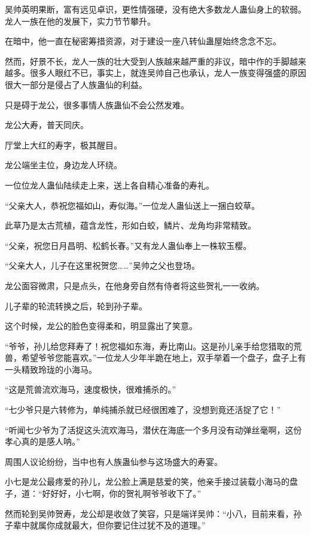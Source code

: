 
\begin{this_body}

吴帅英明果断，富有远见卓识，更性情强硬，没有绝大多数龙人蛊仙身上的软弱。龙人一族在他的发展下，实力节节攀升。

在暗中，他一直在秘密筹措资源，对于建设一座八转仙蛊屋始终念念不忘。

然而，好景不长，龙人一族的壮大受到人族越来越严重的非议，暗中作的手脚越来越多。很多人眼红不已，事实上，就连吴帅自己也承认，龙人一族变得强盛的原因很大一部分是侵占了人族蛊仙的利益。

只是碍于龙公，很多事情人族蛊仙不会公然发难。

龙公大寿，普天同庆。

厅堂上大红的寿字，极其醒目。

龙公端坐主位，身边龙人环绕。

一位位龙人蛊仙陆续走上来，送上各自精心准备的寿礼。

“父亲大人，恭祝您福如山，寿似海。”一位龙人蛊仙送上一捆白蛟草。

此草乃是太古荒植，蕴含龙性，形如白蛟，鳞片、龙角均非常精致。

“父亲，祝您日月昌明、松鹤长春。”又有龙人蛊仙奉上一株软玉樱。

“父亲大人，儿子在这里祝贺您……”吴帅之父也登场。

龙公面容微肃，只是点头，在他身旁自然有侍者将这些贺礼一一收纳。

儿子辈的轮流转换之后，轮到孙子辈。

这个时候，龙公的脸色变得柔和，明显露出了笑意。

“爷爷，孙儿给您拜寿了！祝您福如东海，寿比南山。这是孙儿亲手给您猎取的荒兽，希望爷爷您能喜欢。”一位龙人少年半跪在地上，双手举着一个盘子，盘子上有一头精致玲珑的小海马。

“这是荒兽流欢海马，速度极快，很难捕杀的。”

“七少爷只是六转修为，单纯捕杀就已经很困难了，没想到竟还活捉了它！”

“听闻七少爷为了活捉这头流欢海马，潜伏在海底一个多月没有动弹丝毫啊，这份孝心真的是感人呐。”

周围人议论纷纷，当中也有人族蛊仙参与这场盛大的寿宴。

小七是龙公最疼爱的孙儿，龙公脸上满是慈爱的笑，他亲手接过装载小海马的盘子，道：“好好好，小七啊，你的贺礼啊爷爷收下了。”

然而轮到吴帅贺寿，龙公却是收敛了笑容，只是端详吴帅：“小八，目前来看，孙子辈中就属你成就最大，但你要记住过犹不及的道理。”


\end{this_body}
